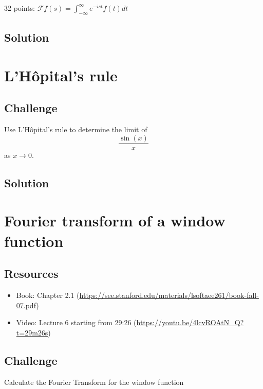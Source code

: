 32 points: $\displaystyle \mathcal{F}f(s)=\int_{-\infty}^{\infty} e^{-i s t} f(t) dt$

\subsection*{Solution}




\newpage
\section{L'H\^opital's rule}

\subsection*{Challenge}
Use L'H\^opital's rule to determine the limit of
\begin{equation}
    \frac{\sin(x)}{x}
\end{equation}
as $x \rightarrow 0$.

\subsection*{Solution}




\newpage
\section{Fourier transform of a window function}
\label{sec:tophat}

\subsection*{Resources}
\begin{itemize}
    \item Book: Chapter 2.1 (\url{https://see.stanford.edu/materials/lsoftaee261/book-fall-07.pdf}) %
    \item Video: Lecture 6 starting from 29:26 (\url{https://youtu.be/4lcvROAtN_Q?t=29m26s})
\end{itemize}

\subsection*{Challenge}
Calculate the Fourier Transform for the window function

